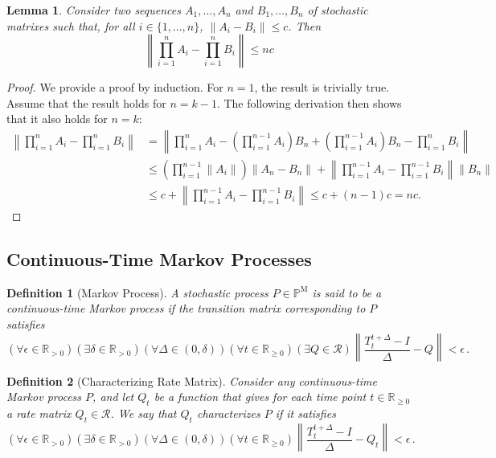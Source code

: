 \documentclass[10pt]{paper}
\newtheorem{lemma}[theorem]{Lemma}
\newtheorem{definition}{Definition}
\newcommand{\reals}{\mathbb{R}}
\newcommand{\realspos}{\reals_{>0}}
\newcommand{\realsnonneg}{\reals_{\geq 0}}
\newcommand{\processes}{\mathbb{P}}
\newcommand{\mprocesses}{\processes^{\mathrm{M}}}
\newcommand{\norm}[1]{\left\lVert #1 \right\rVert}
\begin{document}
\begin{lemma}\label{lemma:differenceproductoftransition}
Consider two sequences $A_1,\dots,A_n$ and $B_1,\dots,B_n$ of stochastic matrixes such that, for all $i\in\{1,\dots,n\}$, $\norm{A_i-B_i}\leq c$. Then
\begin{equation*}
\norm{\prod_{i=1}^nA_i-\prod_{i=1}^nB_i}\leq nc
\end{equation*}
\end{lemma}
\begin{proof}
We provide a proof by induction. For $n=1$, the result is trivially true. Assume that the result holds for $n=k-1$. The following derivation then shows that it also holds for $n=k$: 
\begin{align*}
\norm{\prod_{i=1}^nA_i-\prod_{i=1}^nB_i}
&=
\norm{\prod_{i=1}^{n}A_i-\left(\prod_{i=1}^{n-1}A_i\right)B_n+\left(\prod_{i=1}^{n-1}A_i\right)B_n-\prod_{i=1}^{n}B_i}\\
&\leq
\left(\prod_{i=1}^{n-1}\norm{A_i}\right)\norm{A_n-B_n}+\norm{\prod_{i=1}^{n-1}A_i-\prod_{i=1}^{n-1}B_i}\norm{B_n}\\
&\leq c + \norm{\prod_{i=1}^{n-1}A_i-\prod_{i=1}^{n-1}B_i}\leq c+(n-1)c= nc.
\end{align*}
\end{proof}

\subsection{Continuous-Time Markov Processes}

\begin{definition}[Markov Process]\label{def:markov_process}
A stochastic process $P\in\mprocesses$ is said to be a \emph{continuous-time Markov process} if the transition matrix corresponding to $P$ satisfies
\begin{equation*}
(\forall \epsilon\in\realspos)(\exists \delta\in\realspos)(\forall \Delta\in(0,\delta))(\forall t\in\realsnonneg)(\exists Q\in\mathcal{R}) \norm{\frac{T_t^{t+\Delta} - I}{\Delta} - Q} < \epsilon\,.
\end{equation*}
\end{definition}

\begin{definition}[Characterizing Rate Matrix]\label{def:markov_process_char_matrix}
Consider any continuous-time Markov process $P$, and let $Q_t$ be a function that gives for each time point $t\in\realsnonneg$ a rate matrix $Q_t\in\mathcal{R}$. We say that $Q_t$ \emph{characterizes} $P$ if it satisfies
\begin{equation*}
(\forall \epsilon\in\realspos)(\exists \delta\in\realspos)(\forall \Delta\in(0,\delta))(\forall t\in\realsnonneg)\norm{\frac{T_t^{t+\Delta} - I}{\Delta} - Q_t} < \epsilon\,.
\end{equation*}
\end{definition}
\end{document}
